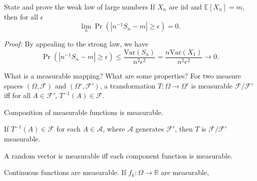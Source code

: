 \documentclass[avery5388,grid,frame]{flashcards}
\newcommand{\R}{\mathbb{R}}
\newcommand{\E}{\mathbb{E}}
\newcommand{\Var}{\text{Var}}
\newcommand{\F}{\mathcal F}
\begin{document}
\begin{flashcard}
    {State and prove the weak law of large numbers}
    If $X_n$ are iid and $\E[X_n] = m$, then for all $\epsilon$
    $$\lim_n \Pr(| n^{-1} S_n - m| \geq \epsilon) = 0.$$

    \emph{Proof:} By appealing to the strong law, we have
    $$\Pr(| n^{-1} S_n - m| \geq \epsilon) \leq \frac{\Var(S_n)}{n^2 \epsilon^2} = \frac{n \Var(X_1)}{n^2 \epsilon^2} \rightarrow 0.$$
\end{flashcard}


\begin{flashcard}
    {What is a measurable mapping? What are some properties?}
    For two measure spaces $(\Omega, \F)$ and $(\Omega', \F')$, a transformation $T: \Omega \rightarrow \Omega'$ is measurable $\F / \F'$ iff for all $A \in \F'$, $T^{-1}(A) \in \F$.

    Composition of measurable functions is measurable.

    If $T^{-1}(A) \in \F$ for each $A \in \mathcal A$, where $\mathcal A$ generates $\F'$, then $T$ is $\F / \F'$ measurable.

    A random vector is measurable iff each component function is measurable.

    Continuous functions are measurable. If $f_k: \Omega \rightarrow \R$ are measurable,
\end{flashcard}
\end{document}

